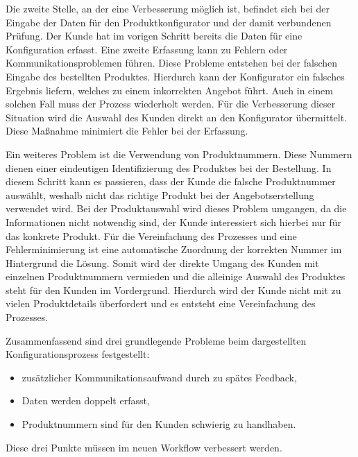 Die zweite Stelle, an der eine Verbesserung möglich ist, befindet sich bei der Eingabe der Daten für den Produktkonfigurator und der damit verbundenen Prüfung. Der Kunde hat im vorigen Schritt bereits die Daten für eine Konfiguration erfasst. Eine zweite Erfassung kann zu Fehlern oder Kommunikationsproblemen führen. Diese Probleme entstehen bei der falschen Eingabe des bestellten Produktes. Hierdurch kann der Konfigurator ein falsches Ergebnis liefern, welches zu einem inkorrekten Angebot führt. Auch in einem solchen Fall muss der Prozess wiederholt werden. Für die Verbesserung dieser Situation wird die Auswahl des Kunden direkt an den Konfigurator übermittelt. Diese Maßnahme minimiert die Fehler bei der Erfassung. \par 

Ein weiteres Problem ist die Verwendung von Produktnummern. Diese Nummern dienen einer eindeutigen Identifizierung des Produktes bei der Bestellung. In diesem Schritt kann es passieren, dass der Kunde die falsche Produktnummer auswählt, weshalb nicht das richtige Produkt bei der Angebotserstellung verwendet wird. Bei der Produktauswahl wird dieses Problem umgangen, da die Informationen nicht notwendig sind, der Kunde interessiert sich hierbei nur für das konkrete Produkt. Für die Vereinfachung des Prozesses und eine Fehlerminimierung ist eine automatische Zuordnung der korrekten Nummer im Hintergrund die Lösung. Somit wird der direkte Umgang des Kunden mit einzelnen Produktnummern vermieden und die alleinige Auswahl des Produktes steht für den Kunden im Vordergrund. Hierdurch wird der Kunde nicht mit zu vielen Produktdetails überfordert und es entsteht eine Vereinfachung des Prozesses. \par

Zusammenfassend sind drei grundlegende Probleme beim dargestellten Konfigurationsprozess festgestellt:
\begin{itemize}

		\item zusätzlicher Kommunikationsaufwand durch zu spätes Feedback,
        \item Daten werden doppelt erfasst,
        \item Produktnummern sind für den Kunden schwierig zu handhaben.
\end{itemize}
Diese drei Punkte müssen im neuen Workflow verbessert werden.

